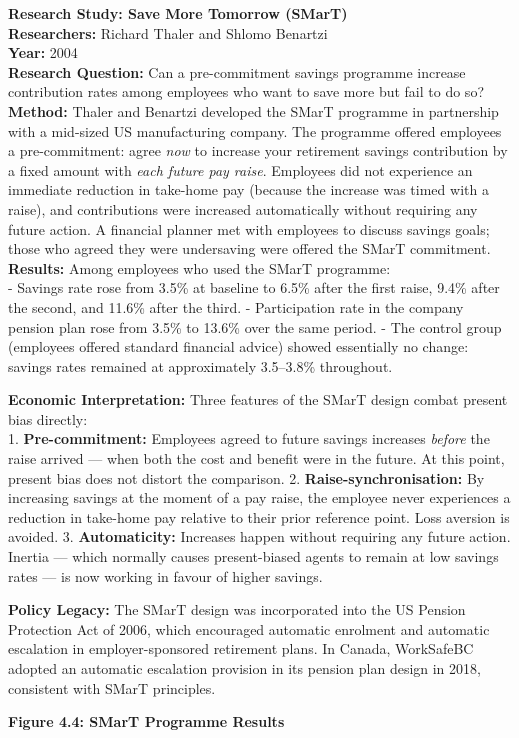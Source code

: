 \documentclass[12pt, letterpaper]{article}
\begin{document}
\begin{researchbox}
\textbf{Research Study: Save More Tomorrow (SMarT)}\\[4pt]

\textbf{Researchers:} Richard Thaler and Shlomo Benartzi\\[4pt]
\textbf{Year:} 2004\\[4pt]
\textbf{Research Question:} Can a pre-commitment savings programme increase contribution rates among employees who want to save more but fail to do so?\\[4pt]
\textbf{Method:} Thaler and Benartzi developed the SMarT programme in partnership with a mid-sized US manufacturing company. The programme offered employees a pre-commitment: agree \textit{now} to increase your retirement savings contribution by a fixed amount with \textit{each future pay raise}. Employees did not experience an immediate reduction in take-home pay (because the increase was timed with a raise), and contributions were increased automatically without requiring any future action. A financial planner met with employees to discuss savings goals; those who agreed they were undersaving were offered the SMarT commitment.\\[4pt]
\textbf{Results:} Among employees who used the SMarT programme:\\[4pt]
- Savings rate rose from 3.5\% at baseline to 6.5\% after the first raise, 9.4\% after the second, and 11.6\% after the third.
- Participation rate in the company pension plan rose from 3.5\% to 13.6\% over the same period.
- The control group (employees offered standard financial advice) showed essentially no change: savings rates remained at approximately 3.5--3.8\% throughout.

\textbf{Economic Interpretation:} Three features of the SMarT design combat present bias directly:\\[4pt]
1. \textbf{Pre-commitment:} Employees agreed to future savings increases \textit{before} the raise arrived --- when both the cost and benefit were in the future. At this point, present bias does not distort the comparison.
2. \textbf{Raise-synchronisation:} By increasing savings at the moment of a pay raise, the employee never experiences a reduction in take-home pay relative to their prior reference point. Loss aversion is avoided.
3. \textbf{Automaticity:} Increases happen without requiring any future action. Inertia --- which normally causes present-biased agents to remain at low savings rates --- is now working in favour of higher savings.

\textbf{Policy Legacy:} The SMarT design was incorporated into the US Pension Protection Act of 2006, which encouraged automatic enrolment and automatic escalation in employer-sponsored retirement plans. In Canada, WorkSafeBC adopted an automatic escalation provision in its pension plan design in 2018, consistent with SMarT principles.\\[4pt]
\end{researchbox}
\newpage
\textbf{Figure 4.4: SMarT Programme Results}
\end{document}
